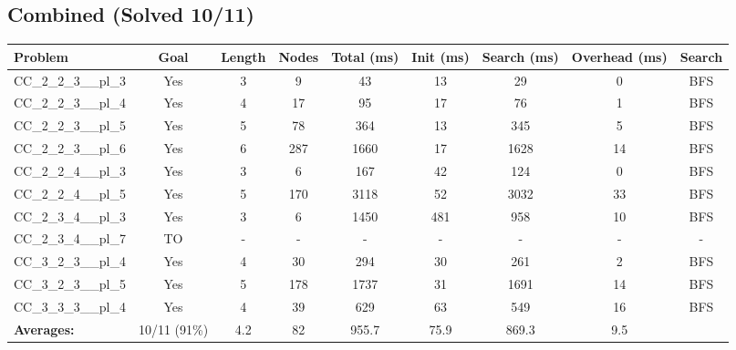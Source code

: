 \documentclass{article}
\begin{document}
\subsection*{Combined (Solved 10/11)}
\begin{tabular}{lcccccccc}
\toprule
Problem & Goal & Length & Nodes & Total (ms) & Init (ms) & Search (ms) & Overhead (ms) & Search \\
\midrule
CC\_2\_2\_3\_\_pl\_3 & Yes & 3 & 9 & 43 & 13 & 29 & 0 & BFS \\
CC\_2\_2\_3\_\_pl\_4 & Yes & 4 & 17 & 95 & 17 & 76 & 1 & BFS \\
CC\_2\_2\_3\_\_pl\_5 & Yes & 5 & 78 & 364 & 13 & 345 & 5 & BFS \\
CC\_2\_2\_3\_\_pl\_6 & Yes & 6 & 287 & 1660 & 17 & 1628 & 14 & BFS \\
CC\_2\_2\_4\_\_pl\_3 & Yes & 3 & 6 & 167 & 42 & 124 & 0 & BFS \\
CC\_2\_2\_4\_\_pl\_5 & Yes & 5 & 170 & 3118 & 52 & 3032 & 33 & BFS \\
CC\_2\_3\_4\_\_pl\_3 & Yes & 3 & 6 & 1450 & 481 & 958 & 10 & BFS \\
CC\_2\_3\_4\_\_pl\_7 & TO & - & - & - & - & - & - & - \\
CC\_3\_2\_3\_\_pl\_4 & Yes & 4 & 30 & 294 & 30 & 261 & 2 & BFS \\
CC\_3\_2\_3\_\_pl\_5 & Yes & 5 & 178 & 1737 & 31 & 1691 & 14 & BFS \\
CC\_3\_3\_3\_\_pl\_4 & Yes & 4 & 39 & 629 & 63 & 549 & 16 & BFS \\
\textbf{Averages:} & 10/11 (91\%) & 4.2 & 82 & 955.7 & 75.9 & 869.3 & 9.5 & \\
\bottomrule
\end{tabular}
\\[0.7cm]
\end{document}
